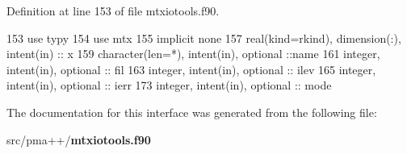 Definition at line 153 of file mtxiotools.\+f90.


\begin{DoxyCode}
153         \textcolor{keywordtype}{use }typy
154         \textcolor{keywordtype}{use }mtx
155         \textcolor{keywordtype}{implicit none}
157         \textcolor{keywordtype}{real(kind=rkind)}, \textcolor{keywordtype}{dimension(:)}, \textcolor{keywordtype}{intent(in)} :: x
159         \textcolor{keywordtype}{character(len=*)}, \textcolor{keywordtype}{intent(in)}, \textcolor{keywordtype}{optional} ::name
161         \textcolor{keywordtype}{integer}, \textcolor{keywordtype}{intent(in)}, \textcolor{keywordtype}{optional} :: fil
163         \textcolor{keywordtype}{integer}, \textcolor{keywordtype}{intent(in)}, \textcolor{keywordtype}{optional} :: ilev
165         \textcolor{keywordtype}{integer}, \textcolor{keywordtype}{intent(in)}, \textcolor{keywordtype}{optional} :: ierr
173         \textcolor{keywordtype}{integer}, \textcolor{keywordtype}{intent(in)}, \textcolor{keywordtype}{optional} :: mode
\end{DoxyCode}


The documentation for this interface was generated from the following file\+:\begin{DoxyCompactItemize}
\item 
src/pma++/{\bf mtxiotools.\+f90}\end{DoxyCompactItemize}
